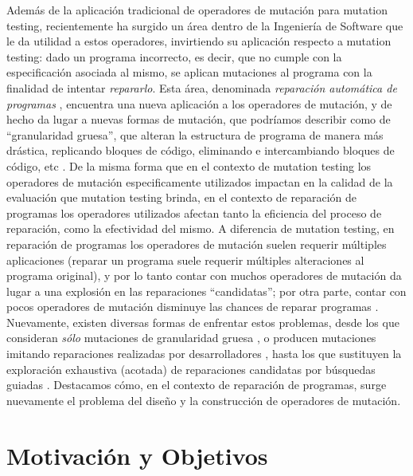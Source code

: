 Adem\'as de la aplicaci\'on tradicional de operadores de mutaci\'on para mutation testing, recientemente ha surgido un \'area dentro de la Ingenier\'ia de Software que le da utilidad a estos operadores, invirtiendo su aplicaci\'on respecto a mutation testing: dado un programa incorrecto, es decir, que no cumple con la especificaci\'on asociada al mismo, se aplican mutaciones al programa con la finalidad de intentar \emph{repararlo}. Esta \'area, denominada \emph{reparaci\'on autom\'atica de programas} \cite{DBLP:journals/cacm/Harman10}, encuentra una nueva aplicaci\'on a los operadores de mutaci\'on, y de hecho da lugar a nuevas formas de mutaci\'on, que podr\'iamos describir como de ``granularidad gruesa'', que alteran la estructura de programa de manera m\'as dr\'astica, replicando bloques de c\'odigo, eliminando e intercambiando bloques de c\'odigo, etc \cite{bibliography.repair.GouesNFW12}. De la misma forma que en el contexto de mutation testing los operadores de mutaci\'on especificamente utilizados impactan en la calidad de la evaluaci\'on que mutation testing brinda, en el contexto de reparaci\'on de programas los operadores utilizados afectan tanto la eficiencia del proceso de reparaci\'on, como la efectividad del mismo. A diferencia de mutation testing, en reparaci\'on de programas los operadores de mutaci\'on suelen requerir m\'ultiples aplicaciones (reparar un programa suele requerir m\'ultiples alteraciones al programa original), y por lo tanto contar con muchos operadores de mutaci\'on da lugar a una explosi\'on en las reparaciones ``candidatas''; por otra parte, contar con pocos operadores de mutaci\'on disminuye las chances de reparar programas \cite{bibliography.repair.GouesNFW12}. Nuevamente, existen diversas formas de enfrentar estos problemas, desde los que consideran \emph{s\'olo} mutaciones de granularidad gruesa \cite{bibliography.repair.GouesNFW12}, o producen mutaciones imitando reparaciones realizadas por desarrolladores \cite{bibliography.repair.KimNSK13}, hasta los que sustituyen la exploraci\'on exhaustiva (acotada) de reparaciones candidatas por b\'usquedas guiadas \cite{bibliography.repair.GouesNFW12,bibliography.repair.StaberJB05,bibliography.repair.ArcuriY08}. Destacamos c\'omo, en el contexto de reparaci\'on de programas, surge nuevamente el problema del dise\~no y la construcci\'on de operadores de mutaci\'on.    


\section{Motivaci\'on y Objetivos}
\label{sec:intro.objetivos}


